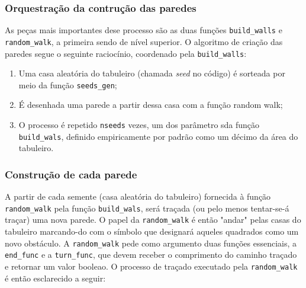 \documentclass[12pt]{article}
\begin{document}
\subsubsection{Orquestração da contrução das paredes}

As peças mais importantes dese processo são as duas funções \verb|build_walls| e \verb|random_walk|, a primeira sendo de nível superior. O algoritmo de criação das paredes segue o seguinte raciocínio, coordenado pela \verb|build_walls|:

\begin{enumerate}
	\item Uma casa aleatória do tabuleiro (chamada \emph{seed} no código) é sorteada por meio da função \verb|seeds_gen|;
	\item É desenhada uma parede a partir dessa casa com a função random walk;
	\item O processo é repetido \verb|nseeds| vezes, um dos parâmetro sda função \verb|build_wals|, definido empiricamente por padrão como um décimo da área do tabuleiro.
\end{enumerate}


\subsubsection{Construção de cada parede}

A partir de cada semente (casa aleatória do tabuleiro) fornecida à função \verb|random_walk| pela função \verb|build_wals|, será traçada (ou pelo menos tentar-se-á traçar) uma nova parede. O papel da \verb|random_walk| é então "andar" pelas casas do tabuleiro marcando-do com o símbolo que designará aqueles quadrados como um novo obstáculo. A \verb|random_walk| pede como argumento duas funções essenciais, a \verb|end_func| e a \verb|turn_func|, que devem receber o comprimento do caminho traçado e retornar um valor booleao. O processo de traçado executado pela \verb|random_walk| é então esclarecido a seguir:
\end{document}
